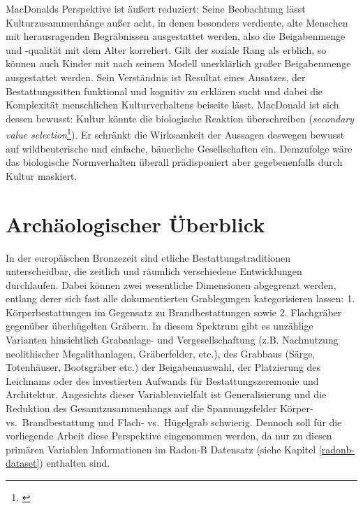 \documentclass[openany,twoside,twocolumn]{book}
\let\rmarkdownfootnote\footnote%
\def\footnote{\protect\rmarkdownfootnote}
\begin{document}
MacDonalds Perspektive ist äußert reduziert: Seine Beobachtung lässt Kulturzusammenhänge außer acht, in denen besonders verdiente, alte Menschen mit herausragenden Begräbnissen ausgestattet werden, also die Beigabenmenge und -qualität mit dem Alter korreliert. Gilt der soziale Rang als erblich, so können auch Kinder mit nach seinem Modell unerklärlich großer Beigabenmenge ausgestattet werden. Sein Verständnis ist Resultat eines Ansatzes, der Bestattungssitten funktional und kognitiv zu erklären sucht und dabei die Komplexität menschlichen Kulturverhaltens beiseite lässt. MacDonald ist sich dessen bewusst: Kultur könnte die biologische Reaktion überschreiben (\emph{secondary value selection}\footnote{\textcite{durham_coevolution_1991-1}}). Er schränkt die Wirksamkeit der Aussagen deswegen bewusst auf wildbeuterische und einfache, bäuerliche Gesellschaften ein. Demzufolge wäre das biologische Normverhalten überall prädisponiert aber gegebenenfalls durch Kultur maskiert.

\hypertarget{regions-archaeological-overview}{%
\section{Archäologischer Überblick}\label{regions-archaeological-overview}}

In der europäischen Bronzezeit sind etliche Bestattungstraditionen unterscheidbar, die zeitlich und räumlich verschiedene Entwicklungen durchlaufen. Dabei können zwei wesentliche Dimensionen abgegrenzt werden, entlang derer sich fast alle dokumentierten Grablegungen kategorisieren lassen: 1. Körperbestattungen im Gegensatz zu Brandbestattungen sowie 2. Flachgräber gegenüber überhügelten Gräbern. In diesem Spektrum gibt es unzählige Varianten hinsichtlich Grabanlage- und Vergesellschaftung (z.B. Nachnutzung neolithischer Megalithanlagen, Gräberfelder, etc.), des Grabbaus (Särge, Totenhäuser, Bootsgräber etc.) der Beigabenauswahl, der Platzierung des Leichnams oder des investierten Aufwands für Bestattungszeremonie und Architektur. Angesichts dieser Variablenvielfalt ist Generalisierung und die Reduktion des Gesamtzusammenhangs auf die Spannungsfelder Körper- vs.~Brandbestattung und Flach- vs.~Hügelgrab schwierig. Dennoch soll für die vorliegende Arbeit diese Perspektive eingenommen werden, da nur zu diesen primären Variablen Informationen im Radon-B Datensatz (siehe Kapitel \ref{radonb-dataset}) enthalten sind.
\end{document}
